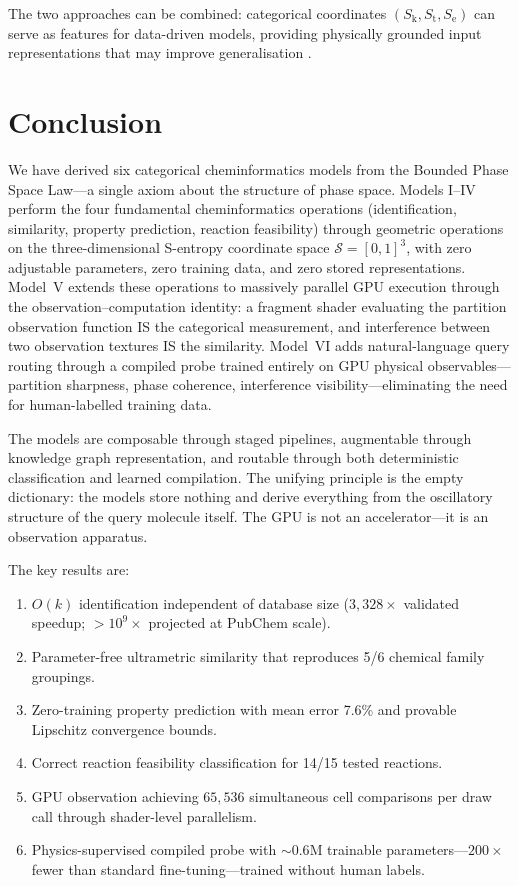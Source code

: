 \documentclass[11pt,twocolumn,a4paper]{article}
\theoremstyle{definition}
\theoremstyle{remark}
\newcommand{\Sk}{S_{\mathrm{k}}}
\newcommand{\St}{S_{\mathrm{t}}}
\newcommand{\Se}{S_{\mathrm{e}}}
\newcommand{\Sspace}{\mathcal{S}}
\begin{document}
The two approaches can be combined: categorical coordinates $(\Sk, \St, \Se)$ can serve as features for data-driven models, providing physically grounded input representations that may improve generalisation \citep{duvenaud2015}.


\section{Conclusion}
\label{sec:conclusion}

We have derived six categorical cheminformatics models from the Bounded Phase Space Law---a single axiom about the structure of phase space. Models I--IV perform the four fundamental cheminformatics operations (identification, similarity, property prediction, reaction feasibility) through geometric operations on the three-dimensional S-entropy coordinate space $\Sspace = [0,1]^3$, with zero adjustable parameters, zero training data, and zero stored representations. Model~V extends these operations to massively parallel GPU execution through the observation--computation identity: a fragment shader evaluating the partition observation function IS the categorical measurement, and interference between two observation textures IS the similarity. Model~VI adds natural-language query routing through a compiled probe trained entirely on GPU physical observables---partition sharpness, phase coherence, interference visibility---eliminating the need for human-labelled training data.

The models are composable through staged pipelines, augmentable through knowledge graph representation, and routable through both deterministic classification and learned compilation. The unifying principle is the empty dictionary: the models store nothing and derive everything from the oscillatory structure of the query molecule itself. The GPU is not an accelerator---it is an observation apparatus.

The key results are:
\begin{enumerate}[nosep]
\item $O(k)$ identification independent of database size ($3{,}328\times$ validated speedup; $>10^9\times$ projected at PubChem scale).
\item Parameter-free ultrametric similarity that reproduces 5/6 chemical family groupings.
\item Zero-training property prediction with mean error 7.6\% and provable Lipschitz convergence bounds.
\item Correct reaction feasibility classification for 14/15 tested reactions.
\item GPU observation achieving $65{,}536$ simultaneous cell comparisons per draw call through shader-level parallelism.
\item Physics-supervised compiled probe with $\sim 0.6$M trainable parameters---$200\times$ fewer than standard fine-tuning---trained without human labels.
\end{enumerate}
\end{document}
